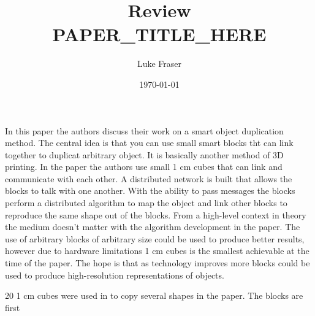 \documentclass{article}
\begin{document}
\title{{\large Review} \\ PAPER_TITLE_HERE}
\author{Luke Fraser}
\date{\today}
\maketitle

\begingroup
\renewcommand{\section}[2]{}


\endgroup

\section*{Summary}
In this paper the authors discuss their work on a smart object duplication method. The central idea is that you can use small smart blocks tht can link together to duplicat arbitrary object. It is basically another method of 3D printing. In the paper the authors use small 1 cm cubes that can link and communicate with each other. A distributed network is built that allows the blocks to talk with one another. With the ability to pass messages the blocks perform a distributed algorithm to map the object and link other blocks to reproduce the same shape out of the blocks. From a high-level context in theory the medium doesn't matter with the algorithm development in the paper. The use of arbitrary blocks of arbitrary size could be used to produce better results, however due to hardware limitations 1 cm cubes is the smallest achievable at the time of the paper. The hope is that as technology improves more blocks could be used to produce high-resolution representations of objects.

20 1 cm cubes were used in to copy several shapes in the paper. The blocks are first 
\section*{Strengths}

\section*{Critique}

\cite{goossens93}
\end{document}
